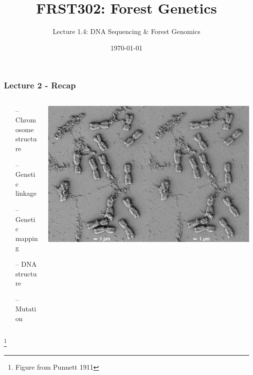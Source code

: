 \documentclass{beamer}
\title{\Huge FRST302: Forest Genetics}
\author{\Large Lecture 1.4: DNA Sequencing \& Forest Genomics}
\date{\today}
\newcommand\blfootnote[1]{%
	\begingroup
	\renewcommand\thefootnote{}\footnote{#1}%
	\addtocounter{footnote}{-1}%
	\endgroup
}
\begin{document}
	\maketitle
	
	
	
	
	\begin{frame}
		\frametitle{Lecture 2 - Recap}
		\begin{columns}
			\begin{column}{0.5\textwidth}
	\begin{itemize}
	\item[--]   Chromosome structure
	\item[--]	Genetic linkage
	\item [--]  Genetic mapping
	\item[--]	DNA structure
	\item[--]	Mutation
\end{itemize}
			\end{column}
			\begin{column}{0.5\textwidth}
				
				\includegraphics[keepaspectratio, width  =\textwidth]{img/barleyChroms}
			\end{column}
		\end{columns}
		
		\blfootnote{Figure from Punnett 1911}
		
	\end{frame}
	
\end{document}
